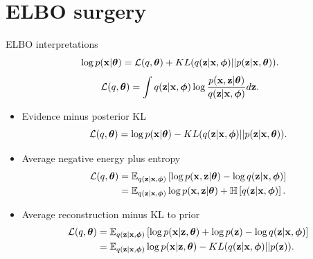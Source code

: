 \section{ELBO surgery}
\begin{frame}{ELBO interpretations}
	\[
		\log p(\bx | \btheta) = \cL (q, \btheta) + KL(q(\bz | \bx, \bphi) || p(\bz | \bx, \btheta)).
	\]
	\[
		\cL (q, \btheta) = \int q(\bz | \bx, \bphi) \log \frac{p(\bx, \bz | \btheta)}{q(\bz | \bx, \bphi)} d \bz.
	\]
	\begin{itemize}
	    \item Evidence minus posterior KL
	    \vspace{-0.1cm}
	    \[
	        \mathcal{L}(q, \btheta) = \log p(\bx | \btheta) - KL(q(\bz | \bx, \bphi) || p(\bz | \bx, \btheta)).
	    \]
	    \item Average negative energy plus entropy
	    \vspace{-0.1cm}
	    \begin{align*}
	        \mathcal{L}(q, \btheta) &= \mathbb{E}_{q(\bz | \bx, \bphi)} \left[\log p(\bx, \bz | \btheta) - \log q(\bz | \bx, \bphi)  \right] \\
	        &= \mathbb{E}_{q(\bz | \bx, \bphi)} \log p(\bx, \bz | \btheta) + \mathbb{H} \left[q(\bz | \bx, \bphi) \right].
	    \end{align*}
	    \item Average reconstruction minus KL to prior
	    \vspace{-0.1cm}
	    \begin{align*}
	        \mathcal{L}(q, \btheta) &= \mathbb{E}_{q(\bz | \bx, \bphi)} \left[ \log p(\bx | \bz, \btheta) + \log p(\bz) - \log q(\bz | \bx, \bphi) \right] \\
	        &= \mathbb{E}_{q(\bz | \bx, \bphi)} \log p(\bx | \bz, \btheta) - KL(q(\bz | \bx, \bphi) || p(\bz)).
	    \end{align*}
	\end{itemize}
\end{frame}
